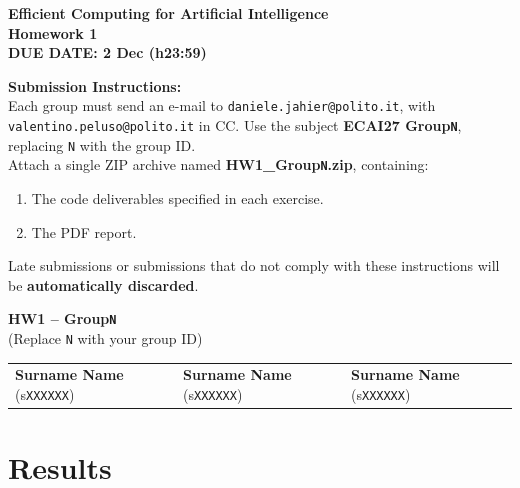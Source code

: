 \documentclass[a4paper,11pt]{article}
\begin{document}
\begin{tcolorbox}[
    colback=white,
    colframe=black,
    width=\textwidth,
    arc=3mm,
    boxrule=1pt
]
\begin{center}
    \Large \textbf{Efficient Computing for Artificial Intelligence}\\[3pt]
    \large \textbf{Homework 1}\\[5pt]
    \textbf{\colorbox{yellow!30}{DUE DATE: 2 Dec (h23:59)}}\\[8pt]
\end{center}

\textbf{Submission Instructions:}\\[3pt]

Each group must send an e-mail to
\texttt{daniele.jahier@polito.it}, with
\texttt{valentino.peluso@polito.it} in CC.
Use the subject
\textbf{ECAI27 Group\texttt{N}}, replacing \texttt{N} with
the group ID.\\[3pt]

Attach a single ZIP archive named
\textbf{HW1\_Group\texttt{N}.zip}, containing:
\begin{enumerate}
    \item The code deliverables specified in each exercise.
    \item The PDF report.
\end{enumerate}

Late submissions or submissions that do not comply with these
instructions will be \textbf{automatically discarded}.
\end{tcolorbox}

\vspace{0.5cm} %

\begin{center}
\Large \textbf{HW1 – Group\texttt{N}}\\
\normalsize (Replace \texttt{N} with your group ID)\\[10pt] %

\begin{tabular}{lll}
\textbf{Surname Name} (s\texttt{XXXXXX}) & \textbf{Surname Name} (s\texttt{XXXXXX}) & \textbf{Surname Name} (s\texttt{XXXXXX}) \\
\end{tabular}
\end{center}

\section*{Results}
\end{document}
